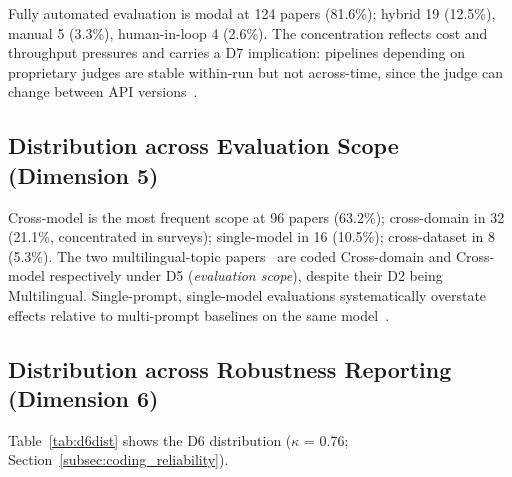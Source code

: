 \documentclass[acmsmall, nonacm, screen]{acmart}
\begin{document}
Fully automated evaluation is modal at 124 papers (81.6\%); hybrid
19 (12.5\%), manual 5 (3.3\%), human-in-loop 4 (2.6\%). The
concentration reflects cost and throughput pressures and carries a
D7 implication: pipelines depending on proprietary judges are
stable within-run but not across-time, since the judge can change
between API versions~\cite{feng2025sage}.

\subsection{Distribution across Evaluation Scope (Dimension 5)}
\label{subsec:d5dist}

Cross-model is the most frequent scope at 96 papers (63.2\%);
cross-domain in 32 (21.1\%, concentrated in surveys); single-model in
16 (10.5\%); cross-dataset in 8 (5.3\%). The two multilingual-topic
papers~\cite{vatsal2025multilingual, son2024mmeval} are coded
Cross-domain and Cross-model respectively under D5
(\emph{evaluation scope}), despite their D2 being Multilingual.
Single-prompt, single-model evaluations systematically overstate
effects relative to multi-prompt baselines on the same
model~\cite{mizrahi2024state}.

\subsection{Distribution across Robustness Reporting (Dimension 6)}
\label{subsec:d6dist}

Table~\ref{tab:d6dist} shows the D6 distribution
($\kappa$ = 0.76; Section~\ref{subsec:coding_reliability}).
\end{document}
